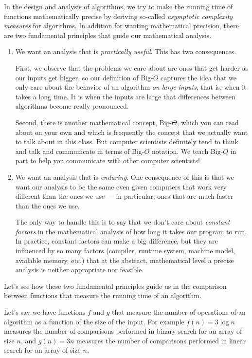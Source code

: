 In the design and analysis of algorithms, we try to make the running time of
functions mathematically precise by deriving so-called \emph{asymptotic
  complexity measures} for algorithms. In addition for wanting mathematical
precision, there are two fundamental principles that guide our mathematical
analysis.
\begin{enumerate}

\item We want an analysis that is \emph{practically useful}. This
  has two consequences.

  First, we observe that the problems we care about are ones that get
  harder as our inputs get bigger, so our definition of Big-$O$
  captures the idea that we only care about the behavior of an
  algorithm \emph{on large inputs}, that is, when it takes a long
  time.  It is when the inputs are large that differences between
  algorithms become really pronounced.

  Second, there is another mathematical concept, Big-$\Theta$, which
  you can read about on your own and which is frequently the concept
  that we actually want to talk about in this class. But computer
  scientists definitely tend to think and talk and communicate in
  terms of Big-$O$ notation. We teach Big-$O$ in part to help you
  communicate with other computer scientists!

\item We want an analysis that is \emph{enduring}. One consequence of
  this is that we want our analysis to be the same even given computers
  that work very different than the ones we use --- in particular, ones
  that are much faster than the ones we use.

  The only way to handle this is to say that we don't care about
  \emph{constant factors} in the mathematical analysis of how long it
  takes our program to run.   In practice,
  constant factors can make a big difference, but they are influenced
  by so many factors (compiler, runtime system, machine model,
  available memory, etc.) that at the abstract, mathematical level a
  precise analysis is neither appropriate nor feasible.

\end{enumerate}
Let's see how these two fundamental principles guide us in the
comparison between functions that measure the running time of an
algorithm.

Let's say we have functions $f$ and $g$ that measure the number of
operations of an algorithm as a function of the size of the input.
For example $f(n) = 3\log n$ measures the number of comparisons performed
in binary search for an array of size $n$, and $g(n) = 3n$
measures the number of comparisons performed in
linear search for an array of size $n$.


